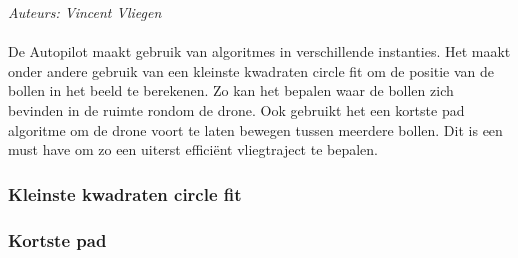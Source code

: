 {\em Auteurs: Vincent  Vliegen}
\\
\\
\noindent
De Autopilot maakt gebruik van algoritmes in verschillende instanties. Het maakt onder andere gebruik van een kleinste kwadraten circle fit om de positie van de bollen in het beeld te berekenen. Zo kan het bepalen waar de bollen zich bevinden in de ruimte rondom de drone. Ook gebruikt het een kortste pad algoritme om de drone voort te laten bewegen tussen meerdere bollen. Dit is een must have om zo een uiterst effici\"ent vliegtraject te bepalen.

\subsubsection{Kleinste kwadraten circle fit}
\label{subsec: Kleinste kwadraten circle fit}


\subsubsection{Kortste pad}
\label{subsec: Kortste pad}
